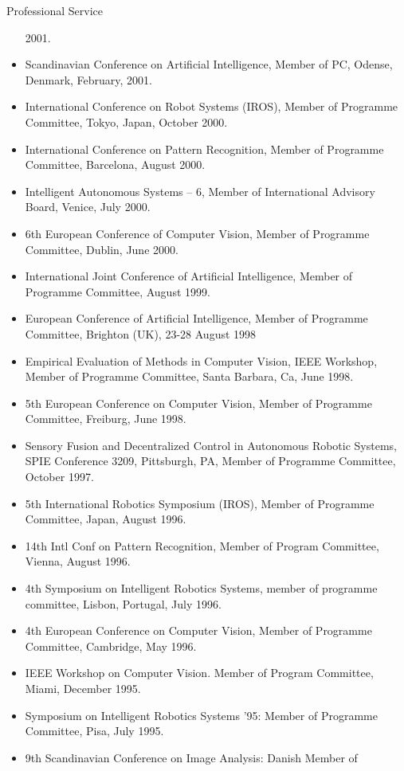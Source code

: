 \documentclass{article}
\begin{document}
\begin{cv}
\begin{cvlist}{Professional Service}
\begin{itemize}
    2001.
  \item Scandinavian Conference on Artificial Intelligence, Member of
    PC, Odense, Denmark, February, 2001.
  \item International Conference on Robot Systems (IROS), Member of
    Programme Committee,  Tokyo, Japan, October 2000.
  \item International Conference on Pattern Recognition, Member of
    Programme Committee, Barcelona, August 2000.
  \item Intelligent Autonomous Systems -- 6, Member of
    International Advisory Board, Venice, July 2000.
  \item 6th European Conference of Computer Vision, Member of Programme
    Committee, Dublin, June 2000.
  \item International Joint Conference of Artificial Intelligence,
    Member of Programme Committee, August 1999.
  \item European Conference of Artificial Intelligence, Member of
    Programme Committee, Brighton (UK), 23-28 August 1998
  \item Empirical Evaluation of Methods in Computer Vision, IEEE
    Workshop, Member of Programme Committee, Santa Barbara, Ca, June
    1998.
  \item 5th European Conference on Computer Vision, Member of Programme
    Committee, Freiburg, June 1998.
  \item Sensory Fusion and Decentralized Control in Autonomous Robotic
    Systems, SPIE Conference 3209, Pittsburgh, PA, Member of Programme
    Committee, October 1997.
  \item 5th International Robotics Symposium (IROS), Member of Programme
    Committee, Japan, August 1996.
  \item 14th Intl Conf on Pattern Recognition, Member of Program
    Committee, Vienna, August 1996.
  \item 4th Symposium on Intelligent Robotics Systems, member of
    programme committee, Lisbon, Portugal, July 1996.
  \item 4th European Conference on Computer Vision, Member of Programme
    Committee, Cambridge, May 1996.
  \item IEEE Workshop on Computer Vision. Member of Program Committee,
    Miami, December 1995.
  \item Symposium on Intelligent Robotics Systems '95: Member of
    Programme Committee, Pisa, July 1995.
  \item 9th Scandinavian Conference on Image Analysis: Danish Member of

\end{itemize}
\end{cvlist}
\end{cv}
\end{document}

